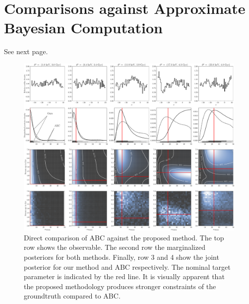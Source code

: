 \documentclass[fleqn,usenatbib]{mnras}
\begin{document}
\section{Comparisons against Approximate Bayesian Computation}
\label{appendix:sec:comparison_abc}
See next page.

\clearpage
\onecolumn

\begin{figure}
    \vspace{1.5cm}
    \centering
    \includegraphics[angle=90,width=.85\linewidth]{figures/abc-new-comparison-panel-1.pdf}
    \caption{
Direct comparison of ABC against the proposed method. The top row shows the observable. The second row the marginalized posteriors for both methods.
Finally, row 3 and 4 show the joint posterior for our method and ABC respectively.
The nominal target parameter is indicated by the red line.
It is visually apparent that the proposed methodology produces stronger constraints of the groundtruth compared to ABC.
    ~~\protect{}}
    \label{fig:abc_new_comparison_panel_1}
\end{figure}
\end{document}
